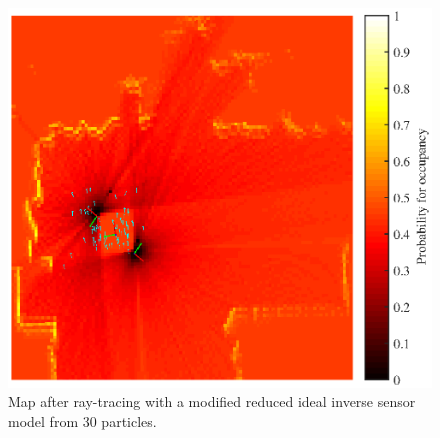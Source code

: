 \begin{figure}[tbph]
	\centering
	\includegraphics[scale=1.0]{figures/static_mapping/particle_principle}
	\caption{Map after ray-tracing with a modified reduced ideal inverse sensor model from 30 particles.}
	\label{fig:particle_principle}
\end{figure}

